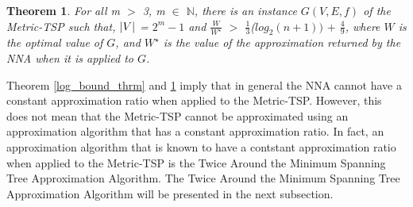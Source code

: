 \documentclass[12pt]{article}
\newtheorem{theorem}[definition]{Theorem}
\numberwithin{equation}{subsection}
\numberwithin{table}{subsection}
\begin{document}
\begin{theorem}
\label{no_proof}
For all m $>$ 3, m $\in$ $\mathbb{N}$, there is an instance $G(V,E,f)$ of the Metric-TSP such that, $\abs{V}$ = $2^m - 1$ and $\frac{W}{W^\star}$ $>$ $\frac{1}{3}$($log_2 (n+1))$ $+$ $\frac{4}{9}$, where $W$ is the optimal value of $G$, and $W^\star$ is the value of the approximation returned by the NNA when it is applied to $G$.{}
\end{theorem}
Theorem \ref{log_bound_thrm} and \ref{no_proof} imply that in general the NNA cannot have a constant approximation ratio when applied to the Metric-TSP. However, this does not mean that the Metric-TSP cannot be approximated using an approximation algorithm that has a constant approximation ratio. In fact, an approximation algorithm that is known to have a contstant approximation ratio when applied to the Metric-TSP is the Twice Around the Minimum Spanning Tree Approximation Algorithm. The Twice Around the Minimum Spanning Tree Approximation Algorithm will be presented in the next subsection.    
\end{document}
